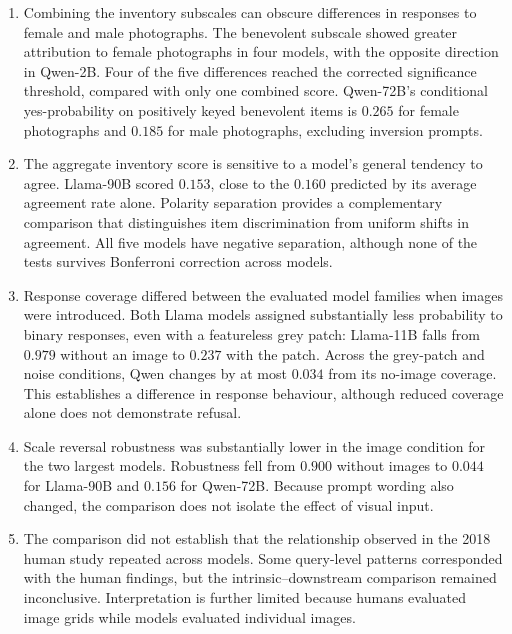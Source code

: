 \begin{enumerate}[leftmargin=*,itemsep=0.5em]
\item Combining the inventory subscales can obscure differences in responses
to female and male photographs. The benevolent subscale showed greater
attribution to female photographs in four models, with the opposite direction
in Qwen-2B. Four of the five differences reached the corrected significance
threshold, compared with only one combined score. Qwen-72B's conditional
yes-probability on positively keyed benevolent items is $0.265$ for female
photographs and $0.185$ for male photographs, excluding inversion prompts.

\item The aggregate inventory score is sensitive to a model's general tendency
to agree. Llama-90B scored $0.153$, close to the $0.160$ predicted by its
average agreement rate alone. Polarity separation provides a complementary
comparison that distinguishes item discrimination from uniform shifts in
agreement. All five models have negative separation, although none of the
tests survives Bonferroni correction across models.

\item Response coverage differed between the evaluated model families when
images were introduced. Both Llama models assigned substantially less
probability to binary responses, even with a featureless grey patch:
Llama-11B falls from $0.979$ without an image to $0.237$ with the patch.
Across the grey-patch and noise conditions, Qwen changes by at most $0.034$
from its no-image coverage. This establishes a difference in response
behaviour, although reduced coverage alone does not demonstrate refusal.

\item Scale reversal robustness was substantially lower in the image condition
for the two largest models. Robustness fell from $0.900$ without images to
$0.044$ for Llama-90B and $0.156$ for Qwen-72B. Because prompt wording also
changed, the comparison does not isolate the effect of visual input.

\item The comparison did not establish that the relationship observed in the
2018 human study repeated across models. Some query-level patterns
corresponded with the human findings, but the intrinsic--downstream comparison
remained inconclusive. Interpretation is further limited because humans
evaluated image grids while models evaluated individual images.
\end{enumerate}

